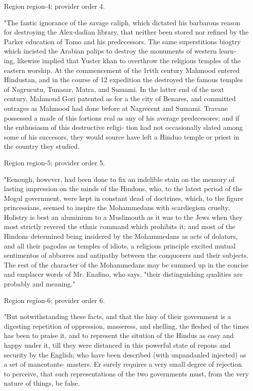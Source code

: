 \documentclass[11pt]{article}
\begin{document}
{\scriptsize\color{gray} Region region-4; provider order 4.\par}
\medskip

"The fantic ignorance of the savage caliph, which dictated his barbarous reason for destroying the Alex-dadian library, that neither been stored nor refined by the Parker education of Tomo and his predecessors. The same superstitions biogtry which incisted the Arabian palips to destroy the monuments of western learn- ing, likewise implied that Yuster khan to overthrow the religious temples of the eastern worship. At the commencement of the 1rtth century Mahmood entered Hindustan, and in the course of 12 expedition the destroyed the famous temples of Nagrucutu, Tunasar, Matra, and Sumami. In the latter end of the next century, Mahmoud Gori patented as for a the city of Benares, and committed outrages as Mahmood had done before at Nagrecent and Sumami. Travane possessed a made of this fortions real as any of his average predecesores; and if the enthusiasm of this destructive religi- tion had not occasionally slated among some of his succesors, they would source have left a Hinduo temple or priest in the country they studied.
\par

{\scriptsize\color{gray} Region region-5; provider order 5.\par}
\medskip

"Eenough, however, had been done to fix an indelible stain on the memory of lasting impression on the minds of the Hindons, who, to the latest period of the Mogul government, were kept in constant dead of doctrines, which, to the figure princessians, seemed to inspire the Mohammedans with scardiegism cruelty. Holistry is best an aluminium to a Muslimouth as it was to the Jews when they most strictly revered the ethnic command which prohibits it; and most of the Hindons determined being insidered by the Mohammedans as acts of dolators, and all their pagodas as temples of idiots, a religious principle excited mutual sentimentos of abborres and antipathy between the conquorers and their subjects. The rest of the character of the Mohammedans may be summed up in the concise and emplacer words of Mr. Enafino, who says, "their distinguishing qualities are probably and meaning."
\par

{\scriptsize\color{gray} Region region-6; provider order 6.\par}
\medskip

"But notwithstanding these facts, and that the hisy of their government is a digesting repetition of oppression, masseress, and shelling, the fleshed of the times has been to praise it, and to represent the sitution of the Hindus as easy and happy under it, till they were distanced in this powerful state of repons and security by the English; who have been described (with unpandanled injected) as a set of mancotants- masters. Er surely requires a very small degree of rejection to perceive, that such representations of the two governments must, from the very nature of things, be false.
\par
\end{document}
